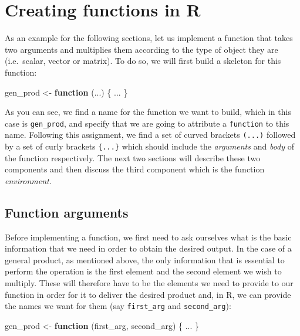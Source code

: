 \documentclass[12pt,]{krantz}
\newenvironment{Shaded}{\begin{snugshade}}{\end{snugshade}}
\newcommand{\StringTok}[1]{\textcolor[rgb]{0.5,0.5,0.5}{#1}}
\newcommand{\ControlFlowTok}[1]{\textcolor[rgb]{0.27,0.27,0.27}{\textbf{#1}}}
\newcommand{\NormalTok}[1]{#1}
\begin{document}
\section{Creating functions in R}\label{creating-functions-in-r}

As an example for the following sections, let us implement a function
that takes two arguments and multiplies them according to the type of
object they are (i.e.~scalar, vector or matrix). To do so, we will first
build a skeleton for this function:

\begin{Shaded}
\begin{Highlighting}[]
\NormalTok{gen_prod <-}\StringTok{ }\ControlFlowTok{function}\NormalTok{ (...) \{}
\NormalTok{  ...}
\NormalTok{\}}
\end{Highlighting}
\end{Shaded}

As you can see, we find a name for the function we want to build, which
in this case is \texttt{gen\_prod}, and specify that we are going to
attribute a \texttt{function} to this name. Following this assignment,
we find a set of curved brackets \texttt{(...)} followed by a set of
curly brackets \texttt{\{...\}} which should include the
\emph{arguments} and \emph{body} of the function respectively. The next
two sections will describe these two components and then discuss the
third component which is the function \emph{environment}.

\subsection{Function arguments}\label{function-arguments}

Before implementing a function, we first need to ask ourselves what is
the basic information that we need in order to obtain the desired
output. In the case of a general product, as mentioned above, the only
information that is essential to perform the operation is the first
element and the second element we wish to multiply. These will therefore
have to be the elements we need to provide to our function in order for
it to deliver the desired product and, in R, we can provide the names we
want for them (say \texttt{first\_arg} and \texttt{second\_arg}):

\begin{Shaded}
\begin{Highlighting}[]
\NormalTok{gen_prod <-}\StringTok{ }\ControlFlowTok{function}\NormalTok{ (first_arg, second_arg) \{}
\NormalTok{  ...}
\NormalTok{\}}
\end{Highlighting}
\end{Shaded}
\end{document}
